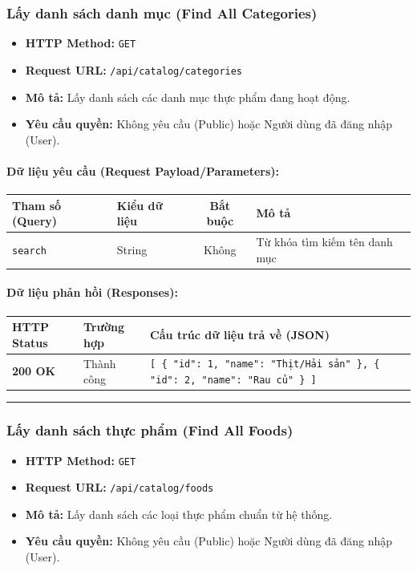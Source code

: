 \documentclass[12pt,a4paper]{article}
\begin{document}
\subsubsection{Lấy danh sách danh mục (Find All Categories)}
\begin{itemize}[leftmargin=*]
    \item \textbf{HTTP Method:} \texttt{GET}
    \item \textbf{Request URL:} \texttt{/api/catalog/categories}
    \item \textbf{Mô tả:} Lấy danh sách các danh mục thực phẩm đang hoạt động.
    \item \textbf{Yêu cầu quyền:} Không yêu cầu (Public) hoặc Người dùng đã đăng nhập (User).
\end{itemize}

\paragraph{Dữ liệu yêu cầu (Request Payload/Parameters):}
\begin{longtable}{|>{\raggedright\arraybackslash}p{2.8cm}|>{\raggedright\arraybackslash}p{2.2cm}|c|>{\raggedright\arraybackslash}p{7.0cm}|}
\hline
\textbf{Tham số (Query)} & \textbf{Kiểu dữ liệu} & \textbf{Bắt buộc} & \textbf{Mô tả} \\ \hline
\endhead
\texttt{search} & String & Không & Từ khóa tìm kiếm tên danh mục \\ \hline
\end{longtable}

\paragraph{Dữ liệu phản hồi (Responses):}
\begin{longtable}{|>{\raggedright\arraybackslash}p{2.8cm}|>{\raggedright\arraybackslash}p{3.2cm}|>{\raggedright\arraybackslash}p{8.0cm}|}
\hline
\textbf{HTTP Status} & \textbf{Trường hợp} & \textbf{Cấu trúc dữ liệu trả về (JSON)} \\ \hline
\endhead
\textbf{200 OK} & Thành công & \texttt{[ \{ "id": 1, "name": "Thịt/Hải sản" \}, \{ "id": 2, "name": "Rau củ" \} ]} \\ \hline
\end{longtable}

\vskip 0.4cm
\noindent\rule{\textwidth}{0.3pt}
\vskip 0.4cm

\subsubsection{Lấy danh sách thực phẩm (Find All Foods)}
\begin{itemize}[leftmargin=*]
    \item \textbf{HTTP Method:} \texttt{GET}
    \item \textbf{Request URL:} \texttt{/api/catalog/foods}
    \item \textbf{Mô tả:} Lấy danh sách các loại thực phẩm chuẩn từ hệ thống.
    \item \textbf{Yêu cầu quyền:} Không yêu cầu (Public) hoặc Người dùng đã đăng nhập (User).
\end{itemize}
\end{document}

